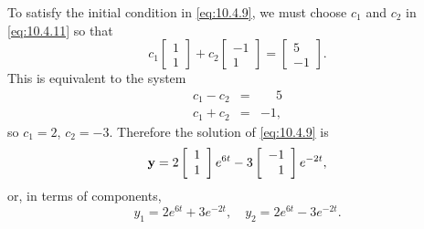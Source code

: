 \begin{examplesolution}
 To satisfy the initial condition in \eqref{eq:10.4.9}, we must choose $c_{1}$ and
$c_{2}$ in \eqref{eq:10.4.11} so that
\[
  c_{1}\left[
  \begin{array}{r}
    1 \\
    1
  \end{array}\right]+c_{2}\left[
  \begin{array}{r}
    -1 \\
    1
  \end{array}\right]=\left[
  \begin{array}{r}
    5  \\
    -1
  \end{array}\right].
\]
This is equivalent to the system
\begin{eqnarray*}
  c_{1}-c_{2} & = & \phantom{-}5 \\
  c_{1}+c_{2} & = & -1,
\end{eqnarray*}
so $c_{1}=2$, $c_{2}=-3$. Therefore the solution of \eqref{eq:10.4.9} is
\[
  {\bf y}=2\left[
  \begin{array}{r}
    1 \\
    1
  \end{array}\right]e^{6t}-3 \left[
  \begin{array}{r}
    -1 \\
    1
  \end{array}\right]e^{-2t},
\]
or, in terms of components,
\[
  y_{1}=2e^{6t}+3e^{-2t},\quad y_{2}=2e^{6t}-3e^{-2t}.
\]
\end{examplesolution}

